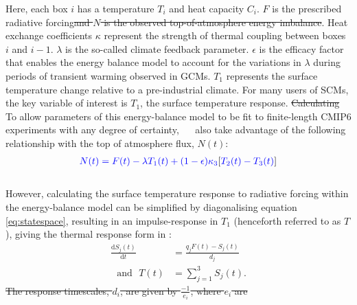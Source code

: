 \documentclass[gmd, manuscript]{copernicus}
\providecommand{\DIFadd}[1]{{\protect\color{blue}#1}} %
\providecommand{\DIFdel}[1]{{\protect\color{red}\sout{#1}}}                      %
\providecommand{\DIFaddbegin}{} %
\providecommand{\DIFaddend}{} %
\providecommand{\DIFdelbegin}{} %
\providecommand{\DIFdelend}{} %
\begin{document}
\DIFaddend Here, each box $i$ has a temperature $T_i$ and heat capacity $C_i$. $F$ is the prescribed radiative forcing\DIFdelbegin \DIFdel{and $N$ is the observed top-of-atmosphere energy imbalance}\DIFdelend . Heat exchange coefficients $\kappa$ represent the strength of thermal coupling between boxes $i$ and $i-1$. $\lambda$ is the so-called climate feedback parameter. $\epsilon$ is the efficacy factor that enables the energy balance model to account for the variations in $\lambda$ during periods of transient warming observed in GCMs. $T_1$ represents the surface temperature change relative to a pre-industrial climate. For many users of SCMs, the key variable of interest is $T_1$, the surface temperature response. \DIFdelbegin \DIFdel{Calculating }\DIFdelend \DIFaddbegin \DIFadd{To allow parameters of this energy-balance model to be fit to finite-length CMIP6 experiments with any degree of certainty, \mbox{%
\citeauthor{Cummins2020} }\hspace{0pt}%
also take advantage of the following relationship with the top of atmosphere flux, $N(t)$:}\\
\begin{align}
    \DIFadd{N(t) = F(t) - \lambda T_1(t) + (1-\epsilon)\kappa_3 }[\DIFadd{T_2(t) - T_3(t)}] \DIFadd{\label{eq:TOA_flux}
}\end{align}\\
\DIFadd{However, calculating }\DIFaddend the surface temperature response \DIFaddbegin \DIFadd{to radiative forcing within the energy-balance model }\DIFaddend can be simplified by diagonalising equation \ref{eq:statespace}, resulting in an impulse-response in $T_1$ (henceforth referred to as $T$), giving the thermal response form in \cite{Millar2016} \citep{Tsutsui2017}:\DIFaddbegin \\
\DIFaddend \begin{align}
    \frac{\text{d}S_j(t)}{\text{d}t} &= \frac{q_jF(t) - S_j(t)}{d_j} \label{eq:response_comp}\\
    \text{~~and~~}T(t) &= \sum_{j=1}^{3}S_j(t). \label{eq:response_sum}
\end{align}\DIFdelbegin \DIFdel{The response timescales, $d_i$, are given by $\frac{-1}{e_i}$, where $e_i$ are }\DIFdelend \DIFaddbegin \\
\end{document}

